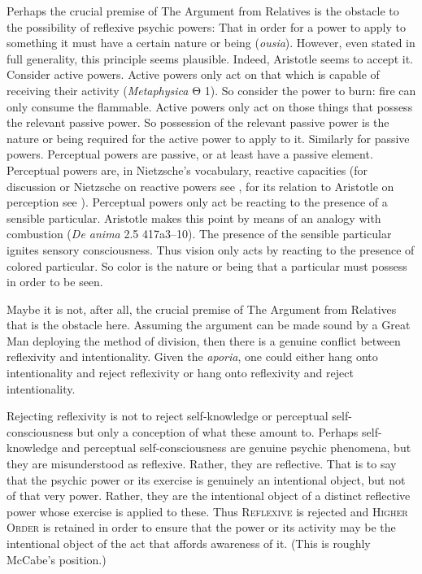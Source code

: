 Perhaps the crucial premise of The Argument from Relatives is the obstacle to the possibility of reflexive psychic powers: That in order for a power to apply to something it must have a certain nature or being (\emph{ousia}). However, even stated in full generality, this principle seems plausible. Indeed, Aristotle seems to accept it. Consider active powers. Active powers only act on that which is capable of receiving their activity (\emph{Metaphysica} {\sbl Θ} 1). So consider the power to burn: fire can only consume the flammable. Active powers only act on those things that possess the relevant passive power. So possession of the relevant passive power is the nature or being required for the active power to apply to it. Similarly for passive powers. Perceptual powers are passive, or at least have a passive element. Perceptual powers are, in Nietzsche's vocabulary, reactive capacities (for discussion or Nietzsche on reactive powers see \citealt{Deleuze:2006as}, for its relation to Aristotle on perception see \citealt[27]{Kalderon:2015fr}). Perceptual powers only act be reacting to the presence of a sensible particular. Aristotle makes this point by means of an analogy with combustion (\emph{De anima} 2.5 417a3–10). The presence of the sensible particular ignites sensory consciousness. Thus vision only acts by reacting to the presence of colored particular. So color is the nature or being that a particular must possess in order to be seen. 

Maybe it is not, after all, the crucial premise of The Argument from Relatives that is the obstacle here. Assuming the argument can be made sound by a Great Man deploying the method of division, then there is a genuine conflict between reflexivity and intentionality. Given the \emph{aporia}, one could either hang onto intentionality and reject reflexivity or hang onto reflexivity and reject intentionality.

Rejecting reflexivity is not to reject self-knowledge or perceptual self-conscious\-ness but only a conception of what these amount to. Perhaps self-knowledge and perceptual self-consciousness are genuine psychic phenomena, but they are misunderstood as reflexive. Rather, they are reflective. That is to say that the psychic power or its exercise is genuinely an intentional object, but not of that very power. Rather, they are the intentional object of a distinct reflective power whose exercise is applied to these. Thus \textsc{Reflexive} is rejected and \textsc{Higher Order} is retained in order to ensure that the power or its activity may be the intentional object of the act that affords awareness of it. (This is roughly McCabe's \citeyear{McCabe:2007ss} position.)

